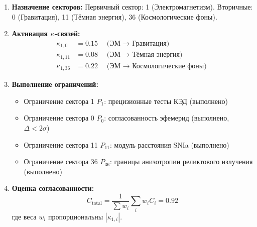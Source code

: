 \documentclass[11pt,a4paper]{article}
\begin{document}
	\begin{enumerate}[leftmargin=*]
		\item \textbf{Назначение секторов:} Первичный сектор: 1 (Электромагнетизм). Вторичные: 0 (Гравитация), 11 (Тёмная энергия), 36 (Космологические фоны).
		
		\item \textbf{Активация $\kappa$-связей:}
		\begin{align*}
			\kappa_{1,0} &= 0.15 \quad \text{(ЭМ $\to$ Гравитация)} \\
			\kappa_{1,11} &= 0.08 \quad \text{(ЭМ $\to$ Тёмная энергия)} \\
			\kappa_{1,36} &= 0.22 \quad \text{(ЭМ $\to$ Космологические фоны)}
		\end{align*}
		
		\item \textbf{Выполнение ограничений:}
		\begin{itemize}
			\item Ограничение сектора 1 $P_1$: прецизионные тесты КЭД (выполнено)
			\item Ограничение сектора 0 $P_0$: согласованность эфемерид (выполнено, $\Delta < 2\sigma$)
			\item Ограничение сектора 11 $P_{11}$: модуль расстояния SNIa (выполнено)
			\item Ограничение сектора 36 $P_{36}$: границы анизотропии реликтового излучения (выполнено)
		\end{itemize}
		
		\item \textbf{Оценка согласованности:}
		\[
		C_{\text{total}} = \frac{1}{\sum w_i}\sum_i w_i C_i = 0.92
		\]
		где веса $w_i$ пропорциональны $|\kappa_{1,i}|$.
	\end{enumerate}
	
\end{document}
